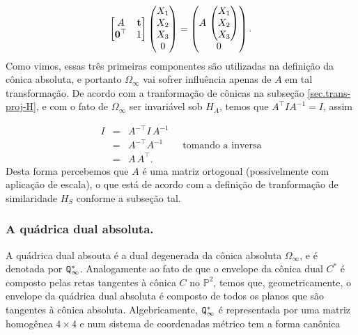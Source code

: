 \begin{equation*}
\begin{bmatrix}
A&{\bf t}\\
{\bf 0}^\top&1
\end{bmatrix}
\begin{pmatrix}
X_1\\
X_2\\
X_3\\
0
\end{pmatrix}
=
\begin{pmatrix}
A\,
\begin{pmatrix}
X_1\\
X_2\\
X_3
\end{pmatrix}\\
0
\end{pmatrix}.
\end{equation*}
Como vimos, essas três primeiras componentes são utilizadas na definição da cônica absoluta, e portanto $\Omega_\infty$ vai sofrer influência apenas de $A$ em tal transformação. 
De acordo com a tranformação de cônicas na subseção \ref{sec.trans-proj-H}, e com o fato de $\Omega_\infty$ ser invariável sob 
$H_A$, temos que $A^\top I A^{-1}=I$, assim

\begin{equation*}
\begin{array}{rcl}
I&=&A^{-\top}I\,A^{-1}\\
&=&A^{-\top}A^{-1}\qquad\text{tomando a inversa}\\
&=&A\,A^\top.
\end{array}
\end{equation*}
Desta forma percebemos que $A$ é uma matriz ortogonal (possivelmente com aplicação de escala), o que está de acordo com a definição de tranformação de similaridade $H_S$ conforme a subseção tal.

\subsubsection{A quádrica dual absoluta.}\label{sec.quadrica-dual-abs}
A quádrica dual absouta é a dual degenerada da cônica absoluta $\Omega_\infty$, e é denotada por 
${\tt Q}^*_\infty$. Analogamente ao fato de que o envelope da cônica dual $C^*$ é composto pelas retas tangentes à cônica $C$ no ${\mathbb{P}}^2$, temos que, geometricamente,  o envelope da quádrica dual absoluta é composto de todos os planos que são tangentes à cônica absoluta. Algebricamente, 
${\tt Q}^*_\infty$ é representada por uma matriz homogênea $4\times4$ e num sistema de coordenadas métrico tem a forma canônica

